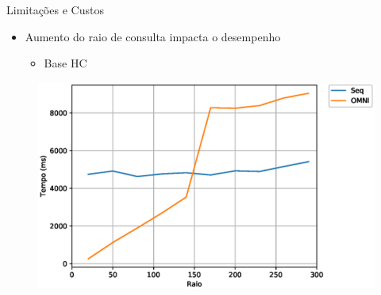 \documentclass{beamer}
\begin{document}
\begin{frame}{Limitações e Custos}
 \begin{itemize}
  \item Aumento do raio de consulta impacta o desempenho\newline
    \begin{itemize}
      \item Base HC
    \end{itemize}
 \end{itemize}

    \begin{figure}[H]
      \centering
      \includegraphics[width=.75\textwidth]{dados/figuras/raioHC.eps}
  \end{figure}
%            
%            
 
\end{frame}
\end{document}
